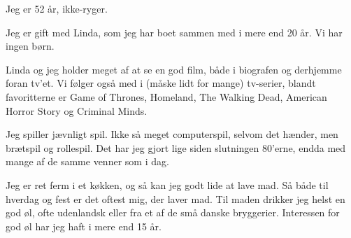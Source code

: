\documentclass[a4paper,11pt]{article}
\begin{document}
Jeg er 52 år, ikke-ryger.

Jeg er gift med Linda, som jeg har boet sammen med i mere end 20
år. Vi har ingen børn.

Linda og jeg holder meget af at se en god film, både i biografen og
derhjemme foran tv’et. Vi følger også med i (måske lidt for mange)
tv-serier, blandt favoritterne er Game of Thrones, Homeland, The
Walking Dead, American Horror Story og Criminal Minds.

Jeg spiller jævnligt spil. Ikke så meget computerspil, selvom det
hænder, men brætspil og rollespil. Det har jeg gjort lige siden
slutningen 80’erne, endda med mange af de samme venner som i dag.

Jeg er ret ferm i et køkken, og så kan jeg godt lide at lave mad. Så
både til hverdag og fest er det oftest mig, der laver mad. Til maden
drikker jeg helst en god øl, ofte udenlandsk eller fra et af de små
danske bryggerier. Interessen for god øl har jeg haft i mere end 15
år.
\end{document}
